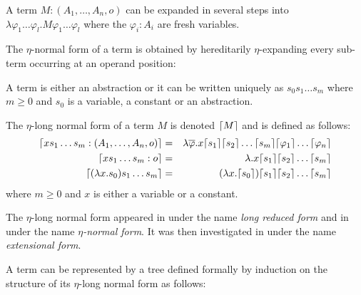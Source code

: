 A term $M : (A_1,\ldots,A_n,o)$ can be expanded in several steps
into $\lambda \varphi_1 \ldots \varphi_l . M \varphi_1 \ldots
\varphi_l$ where the $\varphi_i:A_i$ are fresh variables.

The $\eta$-normal form of a term is obtained by hereditarily $\eta$-expanding every sub-term occurring
at an operand position:

\begin{dfn}
A term is either an abstraction or it can be written uniquely as
$s_0 s_1 \ldots s_m$ where $m\geq0$ and $s_0$ is a variable, a
constant or an abstraction.

The $\eta$-long normal form of a term $M$ is denoted $\lceil M\rceil$ and
is defined as follows:
\begin{eqnarray*}
\lceil x s_1 \ldots s_m : (A_1,\ldots,A_n,o)\rceil &=& \lambda \overline{\varphi} . x \lceil s_1\rceil \lceil s_2\rceil \ldots \lceil s_m\rceil \lceil \varphi_1\rceil \ldots \lceil \varphi_n\rceil \\
\lceil x s_1 \ldots s_m : o\rceil &=& \lambda . x \lceil s_1\rceil \lceil s_2\rceil \ldots \lceil s_m\rceil \\
\lceil (\lambda x . s_0) s_1 \ldots s_m \rceil &=& (\lambda x . \lceil s_0\rceil) \lceil s_1\rceil \lceil s_2\rceil \ldots \lceil s_m\rceil
\end{eqnarray*}
where $m \geq 0$ and $x$ is either a variable or a constant.
\end{dfn}

The $\eta$-long normal form appeared in \citep{DBLP:journals/tcs/JensenP76}
under the name \emph{long reduced form}
and in \citep{DBLP:journals/tcs/Huet75}
under the name \emph{$\eta$-normal form}. It was then investigated in \citep{huet76}
under the name \emph{extensional form}.


A term can be represented by a tree defined formally by induction on the structure
of its $\eta$-long normal form as follows:

